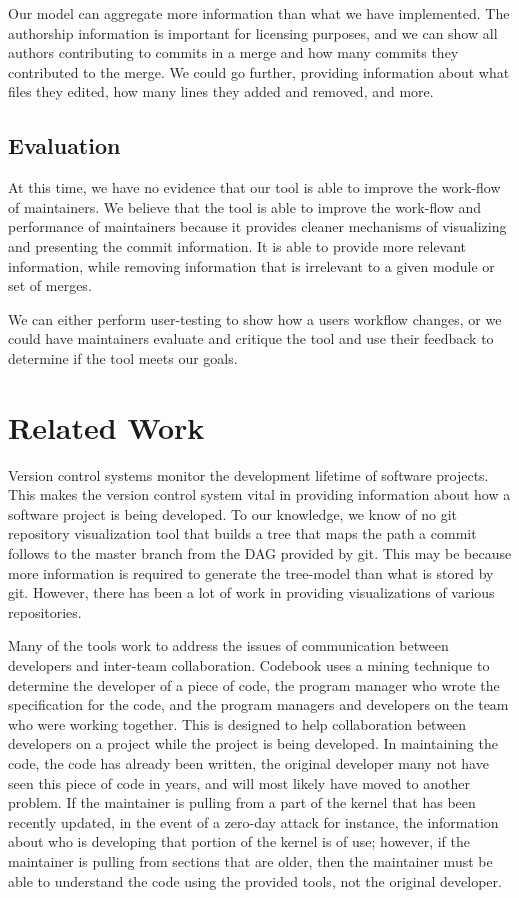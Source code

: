 \documentclass[conference, draftclsnofoot, draft]{IEEEtran}
\begin{document}
Our model can aggregate more information than what we have implemented. The
authorship information is important for licensing purposes, and we can show all
authors contributing to commits in a  merge and how many commits they contributed to
the merge. We could go further, providing information about what files they edited,
how many lines they added and removed, and more.

\subsection{Evaluation}

At this time, we have no evidence that our tool is able to improve the work-flow of
maintainers. We believe that the tool is able to improve the work-flow and
performance of maintainers because it provides cleaner mechanisms of visualizing and
presenting the commit information. It is able to provide more relevant information,
while removing information that is irrelevant to a given module or set of merges.

We can either perform user-testing to show how a users workflow changes, or we could
have maintainers evaluate and critique the tool and use their feedback to determine
if the tool meets our goals.

\section{Related Work}

Version control systems monitor the development lifetime of software projects. This
makes the version control system vital in providing information about how a software
project is being developed. To our knowledge, we know of no git repository
visualization tool that builds a tree that maps the path a commit follows to the
master branch from the DAG provided by git. This may be because more information is
required to generate the tree-model than what is stored by git. However, there has
been a lot of work in providing visualizations of various repositories.

Many of the tools work to address the issues of communication between developers and
inter-team collaboration. Codebook uses a mining technique to determine the
developer of a piece of code, the program manager who wrote the specification for
the code, and the program managers and developers on the team who were working
together\cite{Begel2010}. This is designed to help collaboration between developers
on a project while the project is being developed.  In maintaining the code, the
code has already been written, the original developer many not have seen this piece
of code in years, and will most likely have moved to another problem. If the
maintainer is pulling from a part of the kernel that has been recently updated, in
the event of a zero-day attack for instance, the information about who is developing
that portion of the kernel is of use; however, if the maintainer is pulling from
sections that are older, then the maintainer must be able to understand the code
using the provided tools, not the original developer.
\end{document}
